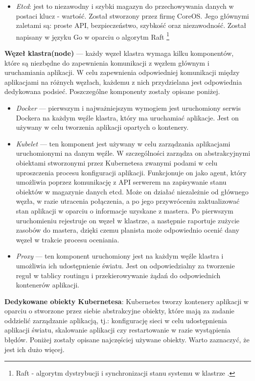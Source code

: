 \documentclass[12pt]{report}
\begin{document}
{\begin{itemize}
\item{{\it Etcd}: jest to niezawodny i szybki magazyn do przechowywania danych w postaci klucz - wartość. Został stworzony przez firmę CoreOS. Jego głównymi zaletami są: proste API, bezpieczeństwo, szybkość oraz niezawodność. Został napisany w języku Go w oparciu o algorytm Raft \footnote{Raft - algorytm dystrybucji i synchronizacji stanu systemu w klastrze \cite{raft}.}}
\end{itemize}
{\bf Węzeł klastra(node)} --- każdy węzeł klastra wymaga kilku komponentów, które są niezbędne do zapewnienia komunikacji z węzłem głównym i uruchamiania aplikacji. W celu zapewnienia odpowiedniej komunikacji między aplikacjami na różnych węzłach, każdemu z nich przydzielana jest odpowiednia dedykowana podsieć. Poszczególne komponenty zostały opisane poniżej.

\begin{itemize}
\item{{\it Docker} --- pierwszym i najważniejszym wymogiem jest uruchomiony serwis Dockera na każdym węźle klastra, który ma uruchamiać aplikacje. Jest on używany w celu tworzenia aplikacji opartych o kontenery.}

\item{{\it Kubelet} --- ten komponent jest używany w celu zarządzania aplikacjami uruchomionymi na danym węźle. W szczególności zarządza on abstrakcyjnymi obiektami stworzonymi przez Kubernetesa zwanymi podami w celu uproszczenia procesu konfiguracji aplikacji. Funkcjonuje on jako agent, który umożliwia poprzez komunikację z API serwerem na zapisywanie stanu obiektów w magazynie danych etcd. Może on działać niezależnie od głównego węzła, w razie utracenia połączenia, a po jego przywróceniu zaktualizować stan aplikacji w oparciu o informacje uzyskane z mastera. Po pierwszym uruchomieniu rejestruje on węzeł w klastrze, a następnie raportuje zużycie zasobów do mastera, dzięki czemu planista może odpowiednio ocenić dany węzeł w trakcie procesu oceniania.}

\item{{\it Proxy} --- ten komponent uruchomiony jest na każdym węźle klastra i umożliwia ich udostępnienie światu. Jest on odpowiedzialny za tworzenie reguł w tablicy routingu i przekierowywanie żądań do odpowiednich kontenerów aplikacji.}
\end{itemize}
{\bf Dedykowane obiekty Kubernetesa}: Kubernetes tworzy kontenery aplikacji w oparciu o stworzone przez siebie abstrakcyjne obiekty, które mają za zadanie oddzielić zarządzanie aplikacją, tj.: konfigurację sieci w celu udostępnienia aplikacji światu, skalowanie aplikacji czy restartowanie w razie wystąpienia błędów. Poniżej zostały opisane najczęściej używane obiekty. Warto zaznaczyć, że jest ich dużo więcej.

}
\end{document}
